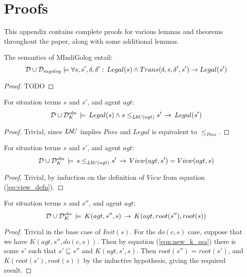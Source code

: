 

\chapter{Proofs}

\label{ch:proofs}

This appendix contains complete proofs for various lemmas and theorems
throughout the paper, along with some additional lemmas.

\begin{lemmaext}
[\ref{lem:MIndiGolog:trans_legal}]
The semantics of MIndiGolog entail:\[
\mathcal{D}\cup\mathcal{D}_{mgolog}\models\forall s,s',\delta,\delta':\, Legal(s)\wedge Trans(\delta,s,\delta',s')\rightarrow Legal(s')\]

\end{lemmaext}
\begin{proof}
TODO
\end{proof}

\begin{lemma}
\label{lem:pbu-implies-legal}For situation terms $s$ and $s'$,
and agent $agt$:\[
\mathcal{D}\cup\mathcal{D}_{K}^{obs}\,\models\, Legal(s)\wedge s\leq_{LbU(agt)}s'\,\rightarrow\, Legal(s')\]

\end{lemma}
\begin{proof}
Trivial, since $LbU$ implies $Poss$ and $Legal$ is equivalent
to $\leq_{Poss}$. 
\end{proof}
\medskip{}


\begin{lemma}
\label{lem:pbu-implies-view}For situation terms $s$ and $s'$, and
agent $agt$:\[
\mathcal{D}\cup\mathcal{D}_{K}^{obs}\,\models\, s\leq_{LbU(agt)}s'\,\rightarrow\, View(agt,s')=View(agt,s)\]

\end{lemma}
\begin{proof}
Trivial, by induction on the definition of $View$ from equation (\ref{eq:view_defn}). 
\end{proof}
\medskip{}


\begin{lemma}
\label{lem:K-implies-root}For situation terms $s$ and $s''$, and
agent $agt$:\[
\mathcal{D}\cup\mathcal{D}_{K}^{obs}\,\models\, K(agt,s'',s)\,\rightarrow\, K(agt,root(s''),root(s))\]

\end{lemma}
\begin{proof}
Trivial in the base case of $Init(s)$. For the $do(c,s)$ case, suppose
that we have $K(agt,s'',do(c,s))$. Then by equation (\ref{eqn:new_k_ssa})
there is some $s'$ such that $s'\sqsubseteq s''$ and $K(agt,s',s)$.
Then $root(s'')$ = $root(s')$, and $K(root(s'),root(s))$ by the
inductive hypothesis, giving the required result. 
\end{proof}
\medskip{}


